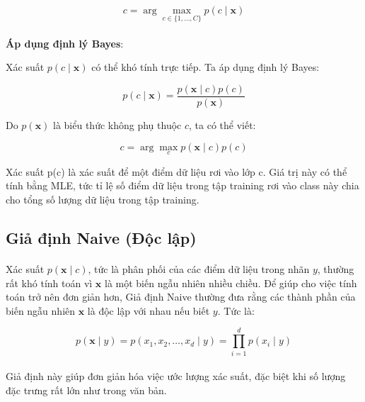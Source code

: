 \begin{equation}
c = \arg\max_{c \in \{1, \ldots, C\}} p(c \mid \mathbf{x})
\end{equation}

\paragraph{}{
\textbf{Áp dụng định lý Bayes}:
}

Xác suất $p(c \mid \mathbf{x})$ có thể khó tính trực tiếp. Ta áp dụng định lý Bayes:

\begin{equation}
p(c \mid \mathbf{x}) = \frac{p(\mathbf{x} \mid c) p(c)}{p(\mathbf{x})}
\end{equation}

Do $p(\mathbf{x})$ là biểu thức không phụ thuộc $c$, ta có thể viết:

\begin{equation}
c = \arg\max_{c} p(\mathbf{x} \mid c) p(c)
\end{equation}

Xác suất p(c) là xác suất để một điểm dữ liệu rơi vào lớp c. Giá trị này có thể tính bằng MLE, tức tỉ lệ số điểm dữ liệu trong tập training rơi vào class này chia cho tổng số lượng dữ liệu trong tập training.

\subsection{Giả định Naive (Độc lập)}

\paragraph{}{Xác suất \( p(\mathbf{x} \mid c) \), tức là phân phối của các điểm dữ liệu trong nhãn \( y \), thường rất khó tính toán vì \( \mathbf{x} \) là một biến ngẫu nhiên nhiều chiều. Để giúp cho việc tính toán trở nên đơn giản hơn, Giả định Naive thường đưa rằng các thành phần của biến ngẫu nhiên \( \mathbf{x} \) là độc lập với nhau nếu biết \( y \). Tức là:}


\[
p(\mathbf{x} \mid y) = p(x_1, x_2, \ldots, x_d \mid y) = \prod_{i=1}^{d} p(x_i \mid y)
\]

\paragraph{}{Giả định này giúp đơn giản hóa việc ước lượng xác suất, đặc biệt khi số lượng đặc trưng rất lớn như trong văn bản.}

